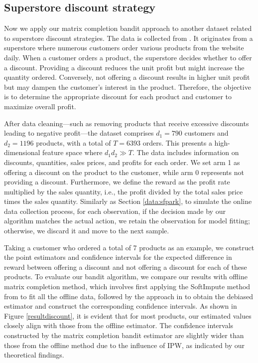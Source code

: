 \documentclass[12pt]{article}
\theoremstyle{plain}
\begin{document}
\subsection{Superstore discount strategy}\label{data:discount}
Now we apply our matrix completion bandit approach to another dataset related to superstore discount strategies. The data is collected from \cite{vivek468_superstore}. It originates from a superstore where numerous customers order various products from the website daily. When a customer orders a product, the superstore decides whether to offer a discount. Providing a discount reduces the unit profit but might increase the quantity ordered. Conversely, not offering a discount results in higher unit profit but may dampen the customer's interest in the product. Therefore, the objective is to determine the appropriate discount for each product and customer to maximize overall profit.

After data cleaning—such as removing products that receive excessive discounts leading to negative profit—the dataset comprises $d_1=790$ customers and $d_2=1196$ products, with a total of $T=6393$ orders. This presents a high-dimensional feature space where $d_1d_2\gg T$. The data includes information on discounts, quantities, sales prices, and profits for each order. We set arm 1 as offering a discount on the product to the customer, while arm 0 represents not providing a discount. Furthermore, we define the reward as the profit rate multiplied by the sales quantity, i.e., the profit divided by the total sales price times the sales quantity. Similarly as Section \ref{data:sfpark}, to simulate the online data collection process, for each observation, if the decision made by our algorithm matches the actual action, we retain the observation for model fitting; otherwise, we discard it and move to the next sample. 


Taking a customer who ordered a total of 7 products as an example, we construct the point estimators and confidence intervals for the expected difference in reward between offering a discount and not offering a discount for each of these products. To evaluate our bandit algorithm, we compare our results with offline matrix completion method, which involves first applying the SoftImpute method from \cite{mazumder2010spectral} to fit all the offline data, followed by the approach in \citep{ma2023multiple} to obtain the debiased estimator and construct the corresponding confidence intervals. As shown in Figure \ref{resultdiscount}, it is evident that for most products, our estimated values closely align with those from the offline estimator. The confidence intervals constructed by the matrix completion bandit estimator are slightly wider than those from the offline method due to the influence of IPW, as indicated by our theoretical findings.
\end{document}
